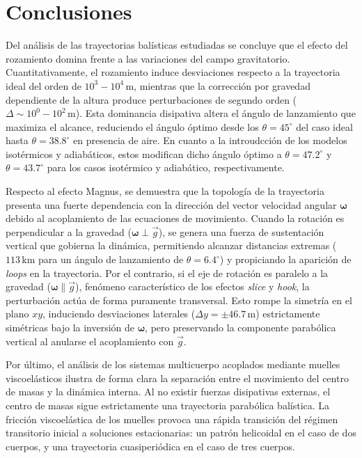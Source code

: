 \section{Conclusiones}

Del análisis de las trayectorias balísticas estudiadas se concluye que el efecto del rozamiento domina frente a las variaciones del campo gravitatorio. Cuantitativamente, el rozamiento induce desviaciones respecto a la trayectoria ideal del orden de $10^3 - 10^4 \, \mathrm{m}$, mientras que la corrección por gravedad dependiente de la altura produce perturbaciones de segundo orden ($\Delta \sim 10^0 - 10^2 \, \mathrm{m}$). Esta dominancia disipativa altera el ángulo de lanzamiento que maximiza el alcance, reduciendo el ángulo óptimo desde los $\theta = 45^\circ$ del caso ideal hasta $\theta = 38.8^\circ$ en presencia de aire. En cuanto a la introudcción de los modelos isotérmicos y adiabáticos, estos modifican dicho ángulo óptimo a $\theta = 47.2^\circ$ y $\theta = 43.7^\circ$ para los casos isotérmico y adiabático, respectivamente.

Respecto al efecto Magnus, se demuestra que la topología de la trayectoria presenta una fuerte dependencia con la dirección del vector velocidad angular $\boldsymbol{\omega}$ debido al acoplamiento de las ecuaciones de movimiento. Cuando la rotación es perpendicular a la gravedad ($\boldsymbol{\omega} \perp \vec{g}$), se genera una fuerza de sustentación vertical que gobierna la dinámica, permitiendo alcanzar distancias extremas ($113\, \mathrm{km}$ para un ángulo de lanzamiento de $\theta = 6.4^\circ$) y propiciando la aparición de \textit{loops} en la trayectoria. Por el contrario, si el eje de rotación es paralelo a la gravedad ($\boldsymbol{\omega} \parallel \vec{g}$), fenómeno característico de los efectos \textit{slice} y \textit{hook}, la perturbación actúa de forma puramente transversal. Esto rompe la simetría en el plano $xy$, induciendo desviaciones laterales ($\Delta y = \pm 46.7 \, \mathrm{m}$) estrictamente simétricas bajo la inversión de $\boldsymbol{\omega}$, pero preservando la componente parabólica vertical al anularse el acoplamiento con $\vec{g}$.

Por último, el análisis de los sistemas multicuerpo acoplados mediante muelles viscoelásticos ilustra de forma clara la separación entre el movimiento del centro de masas y la dinámica interna. Al no existir fuerzas disipativas externas, el centro de masas sigue estrictamente una trayectoria parabólica balística. La fricción viscoelástica de los muelles provoca una rápida transición del régimen transitorio inicial a soluciones estacionarias: un patrón helicoidal en el caso de dos cuerpos, y una trayectoria cuasiperiódica en el caso de tres cuerpos.
